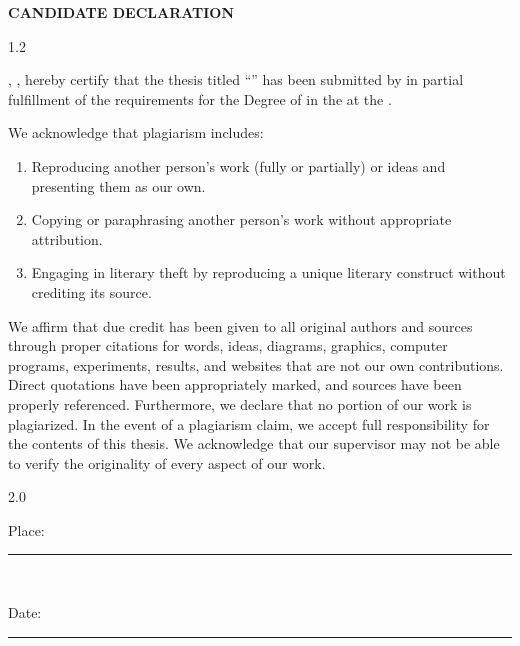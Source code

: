 \begin{center}
    {\large\bfseries CANDIDATE DECLARATION}
\end{center}

\begin{spacing}{1.2}

\noindent \pronounwe, \studentnamesdeclaration, hereby certify that the thesis titled \enquote{\ttitle} has been submitted by \pronounour{} in partial fulfillment of the requirements for the Degree of \degreename{} in the \deptname{} at the \univname.

\par
\noindent We acknowledge that plagiarism includes: 
\begin{enumerate} 
    \item Reproducing another person's work (fully or partially) or ideas and presenting them as our own.
    \item Copying or paraphrasing another person's work without appropriate attribution.
    \item Engaging in literary theft by reproducing a unique literary construct without crediting its source.
\end{enumerate}
\par
We affirm that due credit has been given to all original authors and sources through proper citations for words, ideas, diagrams, graphics, computer programs, experiments, results, and websites that are not our own contributions. Direct quotations have been appropriately marked, and sources have been properly referenced. Furthermore, we declare that no portion of our work is plagiarized. In the event of a plagiarism claim, we accept full responsibility for the contents of this thesis. We acknowledge that our supervisor may not be able to verify the originality of every aspect of our work.
\end{spacing}

\begin{spacing}{2.0}
\noindent
\begin{minipage}[t]{0.4\textwidth}  
    \begin{flushleft} 
        Place: \rule{40mm}{0.1pt}\\
    \end{flushleft}
\end{minipage}
\hfill
\begin{minipage}[t]{0.4\textwidth}
    \begin{flushright}         
        Date: \rule{40mm}{0.1pt}\\       
    \end{flushright}
\end{minipage}
\par
{\studentsignatures} %
\end{spacing}


